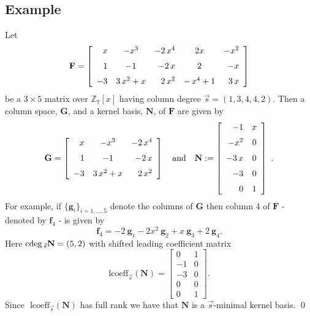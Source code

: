 \subsection{Example}
\begin{example}
\label{ex:example1} Let 
\[
\mathbf{F}=\left[\begin{array}{rcrcr}
x & -{x}^{3} & -2\,{x}^{4} & 2x & -{x}^{2}\\
\noalign{\medskip}1 & -1 & -2\, x & 2 & -x\\
\noalign{\medskip}-3 & 3\,{x}^{2}+x & 2\,{x}^{2} & -\,{x}^{4}+1 & 3\, x
\end{array}\right]
\]
 be a $3\times5$ matrix over $\mathbb{Z}_{7}[x]$ having column degree
$\vec{s}=(1,3,4,4,2)$. Then a column space, $\mathbf{G}$, and a
kernel basis, $\mathbf{N}$, of $\mathbf{F}$ are given by 
\[
\mathbf{G}=\left[\begin{array}{rcr}
x & -{x}^{3} & -2\,{x}^{4}\\
\noalign{\medskip}1 & -1 & -2\, x\\
\noalign{\medskip}-3 & 3\,{x}^{2}+x & 2\,{x}^{2}
\end{array}\right]~~\mbox{ and }~~\mathbf{N}:=\left[\begin{array}{rc}
-1 & x\\
\noalign{\medskip}-{x}^{2} & 0\\
\noalign{\medskip}-3\, x & 0\\
\noalign{\medskip}-3 & 0\\
\noalign{\medskip}0 & 1
\end{array}\right]~.
\]
 For example, if $\{\mathbf{g}_{i}\}_{i=1,...,5}$ denote the columns
of $\mathbf{G}$ then column $4$ of $\mathbf{F}$ - denoted by $\mathbf{f}_{4}$
- is given by 
\[
\mathbf{f}_{4}=-2~\mathbf{g}_{1}-2x^{2}~\mathbf{g}_{2}+x~\mathbf{g}_{3}+2~\mathbf{g}_{4}.
\]
 Here ${\rm cdeg}\,_{\vec{s}}\mathbf{N}=(5,2)$ with shifted leading coefficient
matrix 
\[
\mbox{lcoeff}_{\vec{s}}(\mathbf{N})=\left[\begin{array}{rc}
0 & 1\\
-1 & 0\\
-3 & 0\\
0 & 0\\
0 & 1
\end{array}\right].
\]
 Since $\mbox{ lcoeff}_{\vec{s}}(\mathbf{N})$ has full rank we have
that $\mathbf{N}$ is a $\vec{s}$-minimal kernel basis. \qed \end{example}

